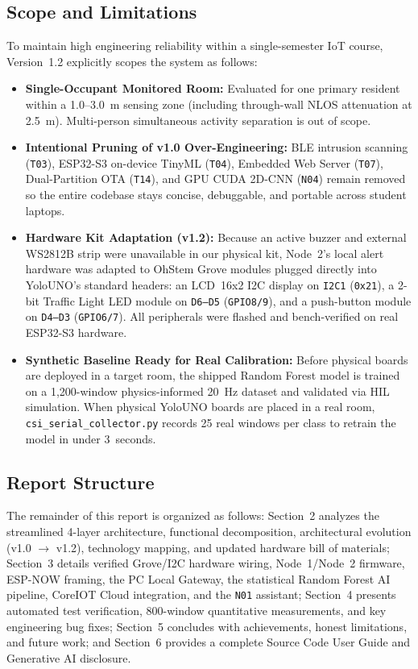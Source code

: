 \documentclass{hcmut-report}
\begin{document}
\subsection{Scope and Limitations}
To maintain high engineering reliability within a single-semester IoT course, Version~1.2 explicitly scopes the system as follows:
\begin{itemize}
  \item \textbf{Single-Occupant Monitored Room:} Evaluated for one primary resident within a 1.0--3.0~m sensing zone (including through-wall NLOS attenuation at 2.5~m). Multi-person simultaneous activity separation is out of scope.
  \item \textbf{Intentional Pruning of v1.0 Over-Engineering:} BLE intrusion scanning (\texttt{T03}), ESP32-S3 on-device TinyML (\texttt{T04}), Embedded Web Server (\texttt{T07}), Dual-Partition OTA (\texttt{T14}), and GPU CUDA 2D-CNN (\texttt{N04}) remain removed so the entire codebase stays concise, debuggable, and portable across student laptops.
  \item \textbf{Hardware Kit Adaptation (v1.2):} Because an active buzzer and external WS2812B strip were unavailable in our physical kit, Node~2's local alert hardware was adapted to OhStem Grove modules plugged directly into YoloUNO's standard headers: an LCD~16x2 I2C display on \texttt{I2C1} (\texttt{0x21}), a 2-bit Traffic Light LED module on \texttt{D6--D5} (\texttt{GPIO8/9}), and a push-button module on \texttt{D4--D3} (\texttt{GPIO6/7}). All peripherals were flashed and bench-verified on real ESP32-S3 hardware.
  \item \textbf{Synthetic Baseline Ready for Real Calibration:} Before physical boards are deployed in a target room, the shipped Random Forest model is trained on a 1,200-window physics-informed 20~Hz dataset and validated via HIL simulation. When physical YoloUNO boards are placed in a real room, \texttt{csi\_serial\_collector.py} records 25 real windows per class to retrain the model in under 3~seconds.
\end{itemize}

\subsection{Report Structure}
The remainder of this report is organized as follows: Section~2 analyzes the streamlined 4-layer architecture, functional decomposition, architectural evolution (v1.0 $\rightarrow$ v1.2), technology mapping, and updated hardware bill of materials; Section~3 details verified Grove/I2C hardware wiring, Node~1/Node~2 firmware, ESP-NOW framing, the PC Local Gateway, the statistical Random Forest AI pipeline, CoreIOT Cloud integration, and the \texttt{N01} assistant; Section~4 presents automated test verification, 800-window quantitative measurements, and key engineering bug fixes; Section~5 concludes with achievements, honest limitations, and future work; and Section~6 provides a complete Source Code User Guide and Generative AI disclosure.
\end{document}
